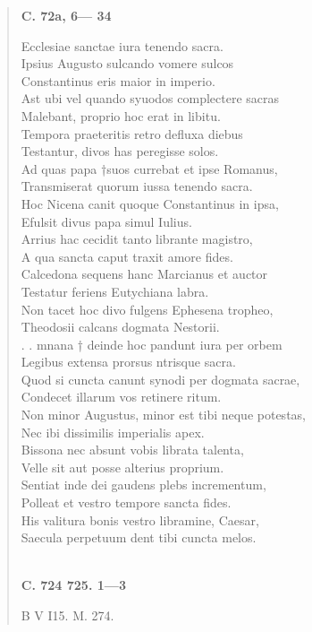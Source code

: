 \documentclass[11pt, a4paper]{report}
\begin{document}
\begin{verse}
     \marginpar{[209]} \begin{center} \textbf{C. 72a, 6— 34} \end{center}Ecclesiae sanctae iura tenendo sacra. \\ Ipsius Augusto sulcando vomere sulcos \\ Constantinus eris maior in imperio. \\ Ast ubi vel quando syuodos complectere sacras \\ Malebant, proprio hoc erat in libitu. \\ Tempora praeteritis retro defluxa diebus \\ Testantur, divos has peregisse solos. \\ Ad quas papa †suos currebat et ipse Romanus, \\ Transmiserat quorum iussa tenendo sacra. \\ Hoc Nicena canit quoque Constantinus in ipsa, \\ Efulsit divus papa simul Iulius. \\ Arrius hac cecidit tanto librante magistro, \\ A qua sancta caput traxit amore fides. \\ Calcedona sequens hanc Marcianus et auctor \\ Testatur feriens Eutychiana labra. \\ Non tacet hoc divo fulgens Ephesena tropheo, \\ Theodosii calcans dogmata Nestorii. \\ . . mnana † deinde hoc pandunt iura per orbem \\ Legibus extensa prorsus ntrisque sacra. \\  \lbrack Quod \rbrack si cuncta canunt synodi per dogmata sacrae, \\ Condecet illarum vos retinere ritum. \\ Non minor Augustus, minor est tibi neque potestas, \\ Nec ibi dissimilis imperialis apex. \\ Bissona nec absunt vobis librata talenta, \\ Velle sit aut posse alterius proprium. \\ Sentiat inde dei gaudens plebs incrementum, \\ Polleat et vestro tempore sancta fides. \\ His valitura bonis vestro libramine, Caesar, \\ Saecula perpetuum dent tibi cuncta melos. \\ 
        ﻿\pagebreak 
     \marginpar{[210]} \begin{center} \textbf{C. 724 725. 1—3} \end{center}B V I15. M. 274. \\ 
      \end{verse}
  
\end{document}
